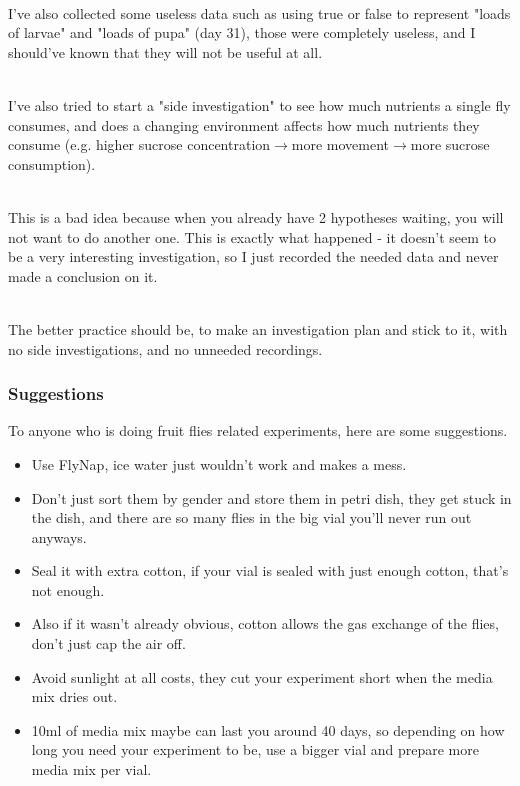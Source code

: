 \documentclass{article}
\begin{document}
\noindent\\
I've also collected some useless data such as using true or false to represent "loads of larvae" and "loads of pupa" (day 31), those were completely useless, and I should've known that they will not be useful at all.

\noindent\\
I've also tried to start a "side investigation" to see how much nutrients a single fly consumes, and does a changing environment affects how much nutrients they consume (e.g. higher sucrose concentration$\to$more movement$\to$more sucrose consumption).

\noindent\\
This is a bad idea because when you already have 2 hypotheses waiting, you will not want to do another one. This is exactly what happened - it doesn't seem to be a very interesting investigation, so I just recorded the needed data and never made a conclusion on it.

\noindent\\
The better practice should be, to make an investigation plan and stick to it, with no side investigations, and no unneeded recordings.

\subsubsection{Suggestions}

To anyone who is doing fruit flies related experiments, here are some suggestions.

\begin{itemize}
  \item Use FlyNap, ice water just wouldn't work and makes a mess.
  \item Don't just sort them by gender and store them in petri dish, they get stuck in the dish, and there are so many flies in the big vial you'll never run out anyways.
  \item Seal it with extra cotton, if your vial is sealed with just enough cotton, that's not enough.
  \item Also if it wasn't already obvious, cotton allows the gas exchange of the flies, don't just cap the air off.
  \item Avoid sunlight at all costs, they cut your experiment short when the media mix dries out.
  \item 10ml of media mix maybe can last you around 40 days, so depending on how long you need your experiment to be, use a bigger vial and prepare more media mix per vial.
\end{itemize}
\end{document}
